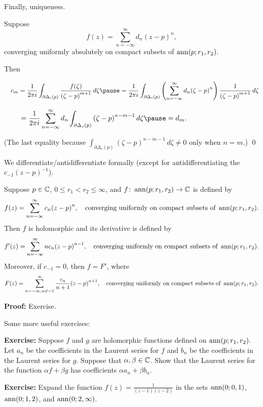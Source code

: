 \documentclass[10pt,aspectratio=169]{beamer}
\begin{document}
\begin{frame}
Finally, uniqueness.

\medskip
\pause
Suppose
\[
f(z)
=
\sum_{n=-\infty}^{\infty} d_n {(z-p)}^{n} ,
\]
converging uniformly absolutely on compact subsets of $\operatorname{ann}(p;r_1,r_2)$.

\medskip
\pause

Then

\medskip
\pause

$\displaystyle
\quad
c_m
= \frac{1}{2\pi i}
\int_{\partial \Delta_{s}(p)} \frac{f(\zeta)}{{(\zeta-p)}^{m+1}}
 \, d\zeta 
\pause
=
\frac{1}{2\pi i}
\int_{\partial \Delta_{s}(p)}
\left(\sum_{n=-\infty}^{\infty} d_n {(\zeta-p)}^{n} \right)
\frac{1}{{(\zeta-p)}^{m+1}}
 \, d\zeta 
$
\medskip
\pause

$\displaystyle
\quad \quad \,\,
=
\frac{1}{2\pi i}
\sum_{n=-\infty}^{\infty}
d_n
\int_{\partial \Delta_{s}(p)}
{(\zeta-p)}^{n-m-1}
 \, d\zeta 
\pause
=
d_m .
$

\medskip

(The last equality because
$\int_{\partial \Delta_{s}(p)}
{(\zeta-p)}^{n-m-1}
 \, d\zeta \not= 0$ only when $n=m$.)
\qed
\end{frame}

\begin{frame}
We differentiate/antidifferentiate formally
(except for antidifferentiating the $c_{-1}{(z-p)}^{-1}$).

\pause

\begin{proposition}
Suppose $p \in {\mathbb{C}}$, $0 \leq r_1 < r_2 \leq \infty$, and
$f \colon \operatorname{ann}(p;r_1,r_2) \to {\mathbb{C}}$ is defined by
\[
f(z) = \sum_{n=-\infty}^\infty c_n {(z-p)}^n ,
\quad
\text{converging uniformly on compact subsets of } \operatorname{ann}(p;r_1,r_2).
\]
\pause
Then $f$ is holomorphic and its 
derivative is defined by
\[
f'(z) = \sum_{n=-\infty}^\infty n c_n {(z-p)}^{n-1} ,
\quad
\text{converging uniformly on compact subsets of } \operatorname{ann}(p;r_1,r_2).
\]
\pause
Moreover, if $c_{-1} = 0$, then $f = F'$, where
\[
F(z) = \sum_{n=-\infty,n\not=-1}^\infty \frac{c_n}{n+1} {(z-p)}^{n+1},
\quad
\text{converging uniformly on compact subsets of } \operatorname{ann}(p;r_1,r_2).
\]
\end{proposition}

\pause

\textbf{Proof:} Exercise.
\end{frame}

\begin{frame}
Some more useful exercises:

\medskip
\pause

\textbf{Exercise:}
Suppose $f$ and $g$ are holomorphic functions defined on
$\operatorname{ann}(p;r_1,r_2)$.  Let $a_n$ be the coefficients in the Laurent series for
$f$ and $b_n$ be the coefficients in the Laurent series for $g$.  Suppose
that $\alpha,\beta \in {\mathbb{C}}$.  Show that the Laurent series for the function
$\alpha f + \beta g$ has coefficients $\alpha a_n + \beta b_n$.

\medskip
\pause

\textbf{Exercise:}
Expand the function $f(z) = \frac{1}{(z-1)(z-2)}$ in the
sets
$\operatorname{ann}(0;0,1)$, $\operatorname{ann}(0;1,2)$, and $\operatorname{ann}(0;2,\infty)$.


\end{frame}
\end{document}
